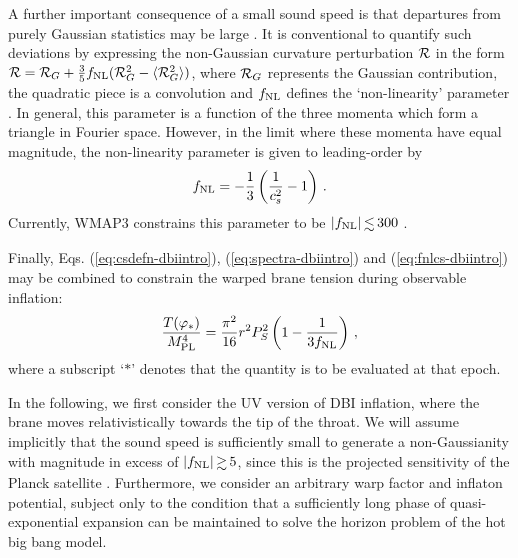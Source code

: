 A further important consequence of a small sound speed is that departures  
from purely Gaussian statistics may be large 
\cite{brane6,brane11,lidser3,chenetal}. 
It is conventional 
to quantify such deviations by expressing the non-Gaussian curvature 
perturbation ${\cal{R}}$ in the form 
${\cal{R}} ={\cal{R}}_G + \frac{3}{5}f_{\mathrm{NL}}
({\cal{R}}^2_G -\langle {\cal{R}}^2_G \rangle)$, where 
${\cal{R}}_G$ represents the Gaussian contribution, 
the quadratic piece is a convolution and $f_{\mathrm{NL}}$ defines 
the `non-linearity' parameter \cite{maldacena}. 
In general, this parameter is a function of the three momenta which 
form a triangle in Fourier space. However, in the limit where 
these momenta have equal magnitude, the non-linearity parameter 
is given to leading-order by \cite{chenetal,lidser2}  
% 
\begin{equation}
\label{eq:fnlcs-dbiintro}
f_{\mathrm{NL}} = -\frac{1}{3} \left( \frac{1}{c_s^2} -1 \right) \,.
\end{equation}
% 
Currently, WMAP3 constrains this parameter  
to be ${| \fnl |} \, {\lsim} \, {300}$ \cite{spergel,crim}.  


Finally, Eqs. (\ref{eq:csdefn-dbiintro}), (\ref{eq:spectra-dbiintro}) and (\ref{eq:fnlcs-dbiintro}) 
may be combined to constrain the warped brane tension 
during observable inflation: 
% 
\begin{equation}
\label{eq:obswarp-dbiintro}
\frac{T (\varphi_*)}{M_{\mathrm{PL}}^4}  = 
\frac{\pi^2}{16} r^2P_S^2 \left( 1-\frac{1}{3f_{\mathrm{NL}}} \right) \,,
\end{equation}
% 
where a subscript `$*$' denotes that the quantity is to be evaluated 
at that epoch. 


In the following, we first consider the UV version of DBI inflation,
where the brane moves relativistically 
towards the tip of the throat. We will assume implicitly 
that the sound speed is sufficiently small to generate a non-Gaussianity with magnitude in 
excess of $|\fnl| \, {\gsim} \, 5$, since this is the projected 
sensitivity of the Planck satellite \cite{planck}. Furthermore, we consider   
an arbitrary warp factor and inflaton potential, 
subject only to the condition that a sufficiently long phase of 
quasi-exponential expansion can be maintained to solve the horizon problem of
the hot big bang model. 
% 
%




